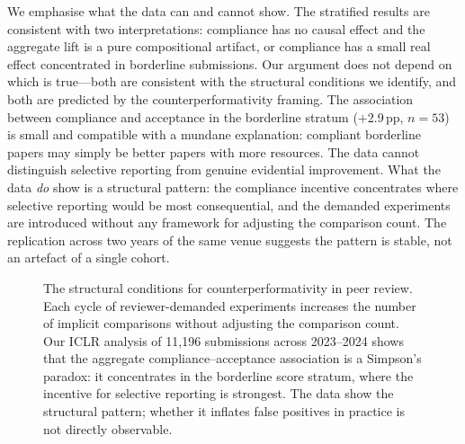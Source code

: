 \documentclass{article}
\begin{document}
We emphasise what the data can and cannot show. The stratified results are consistent with two interpretations: compliance has no causal effect and the aggregate lift is a pure compositional artifact, or compliance has a small real effect concentrated in borderline submissions. Our argument does not depend on which is true---both are consistent with the structural conditions we identify, and both are predicted by the counterperformativity framing. The association between compliance and acceptance in the borderline stratum ($+$2.9\,pp, $n = 53$) is small and compatible with a mundane explanation: compliant borderline papers may simply be better papers with more resources. The data cannot distinguish selective reporting from genuine evidential improvement. What the data \textit{do} show is a structural pattern: the compliance incentive concentrates where selective reporting would be most consequential, and the demanded experiments are introduced without any framework for adjusting the comparison count. The replication across two years of the same venue suggests the pattern is stable, not an artefact of a single cohort.


\begin{figure}[t]
\centering
{}
\caption{The structural conditions for counterperformativity in peer review. Each cycle of reviewer-demanded experiments increases the number of implicit comparisons without adjusting the comparison count. Our ICLR analysis of 11,196 submissions across 2023--2024 shows that the aggregate compliance--acceptance association is a Simpson's paradox: it concentrates in the borderline score stratum, where the incentive for selective reporting is strongest. The data show the structural pattern; whether it inflates false positives in practice is not directly observable.}
\label{fig:loop}
\end{figure}
\end{document}

